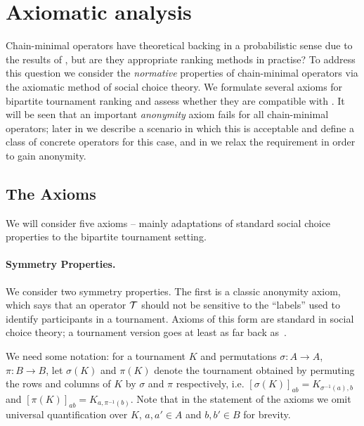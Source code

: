 \section{Axiomatic analysis}
\label{tourn_sec_axiomatic_analysis}

Chain-minimal operators have theoretical backing in a probabilistic sense due
to the results of , but are they appropriate ranking methods in
practise? To address this question we consider the \emph{normative} properties
of chain-minimal operators via the axiomatic method of social choice theory. We
formulate several axioms for bipartite tournament ranking
and assess whether they
are compatible with \chainmin{}. It will be seen that an important
\emph{anonymity} axiom fails for all chain-minimal operators; later in
 we describe a scenario in which this is
acceptable and define a class of concrete operators for this case, and in
 we relax the \chainmin{} requirement in
order to gain anonymity.

\subsection{The Axioms}

We will consider five axioms -- mainly adaptations of standard social choice
properties to the bipartite tournament setting.

\paragraph{Symmetry Properties.}
%
We consider two symmetry properties. The first is a classic anonymity
axiom, which says that an operator $\mathcal{T}$ should not be sensitive to the
``labels'' used to identify participants in a tournament. Axioms of this form are
standard in social choice theory; a tournament version goes at least as far
back as~\cite{rubinstein1980ranking}.

We need some notation: for a tournament $K$ and permutations $\sigma: A \to A$,
$\pi: B \to B$, let $\sigma(K)$ and $\pi(K)$ denote the tournament obtained by
permuting the rows and columns of $K$ by $\sigma$ and $\pi$ respectively, i.e.
$[\sigma(K)]_{ab} = K_{\sigma^{-1}(a), b}$ and $[\pi(K)]_{ab} = K_{a,
\pi^{-1}(b)}$. Note that in the statement of the axioms we omit universal
quantification over $K$, $a, a' \in A$ and $b, b' \in B$ for
brevity.

